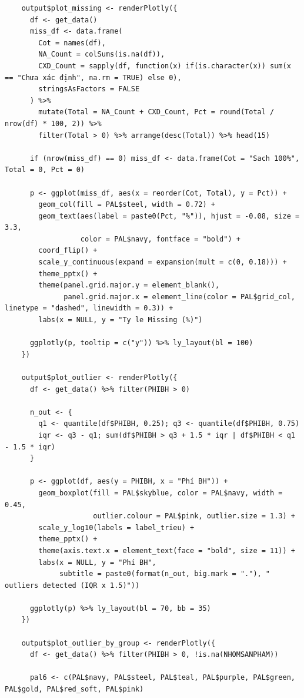 \documentclass[12pt, a4paper]{article}
\begin{document}
\begin{lstlisting}
    output$plot_missing <- renderPlotly({
      df <- get_data()
      miss_df <- data.frame(
        Cot = names(df),
        NA_Count = colSums(is.na(df)),
        CXD_Count = sapply(df, function(x) if(is.character(x)) sum(x == "Chưa xác định", na.rm = TRUE) else 0),
        stringsAsFactors = FALSE
      ) %>%
        mutate(Total = NA_Count + CXD_Count, Pct = round(Total / nrow(df) * 100, 2)) %>%
        filter(Total > 0) %>% arrange(desc(Total)) %>% head(15)

      if (nrow(miss_df) == 0) miss_df <- data.frame(Cot = "Sach 100%", Total = 0, Pct = 0)

      p <- ggplot(miss_df, aes(x = reorder(Cot, Total), y = Pct)) +
        geom_col(fill = PAL$steel, width = 0.72) +
        geom_text(aes(label = paste0(Pct, "%")), hjust = -0.08, size = 3.3,
                  color = PAL$navy, fontface = "bold") +
        coord_flip() +
        scale_y_continuous(expand = expansion(mult = c(0, 0.18))) +
        theme_pptx() +
        theme(panel.grid.major.y = element_blank(),
              panel.grid.major.x = element_line(color = PAL$grid_col, linetype = "dashed", linewidth = 0.3)) +
        labs(x = NULL, y = "Ty le Missing (%)")

      ggplotly(p, tooltip = c("y")) %>% ly_layout(bl = 100)
    })

    output$plot_outlier <- renderPlotly({
      df <- get_data() %>% filter(PHIBH > 0)

      n_out <- {
        q1 <- quantile(df$PHIBH, 0.25); q3 <- quantile(df$PHIBH, 0.75)
        iqr <- q3 - q1; sum(df$PHIBH > q3 + 1.5 * iqr | df$PHIBH < q1 - 1.5 * iqr)
      }

      p <- ggplot(df, aes(y = PHIBH, x = "Phí BH")) +
        geom_boxplot(fill = PAL$skyblue, color = PAL$navy, width = 0.45,
                     outlier.colour = PAL$pink, outlier.size = 1.3) +
        scale_y_log10(labels = label_trieu) +
        theme_pptx() +
        theme(axis.text.x = element_text(face = "bold", size = 11)) +
        labs(x = NULL, y = "Phí BH",
             subtitle = paste0(format(n_out, big.mark = "."), " outliers detected (IQR x 1.5)"))

      ggplotly(p) %>% ly_layout(bl = 70, bb = 35)
    })

    output$plot_outlier_by_group <- renderPlotly({
      df <- get_data() %>% filter(PHIBH > 0, !is.na(NHOMSANPHAM))

      pal6 <- c(PAL$navy, PAL$steel, PAL$teal, PAL$purple, PAL$green, PAL$gold, PAL$red_soft, PAL$pink)


\end{lstlisting}
\end{document}
